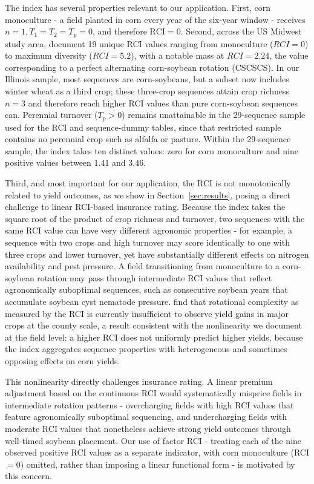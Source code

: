 \documentclass[12pt,letterpaper]{article}
\theoremstyle{remark}
\theoremstyle{remark}
\theoremstyle{plain}
\theoremstyle{definition}
\begin{document}
The index has several properties relevant to our application. First, corn monoculture - a field planted in corn every year of the six-year window - receives $n=1, T_{1}=T_{2}=T_{p}=0$, and therefore $\text{RCI} = 0$. Second, across the US Midwest study area, \citet{socolar2021} document 19 unique RCI values ranging from monoculture ($RCI = 0$) to maximum diversity ($RCI = 5.2$), with a notable mass at $RCI = 2.24$, the value corresponding to a perfect alternating corn-soybean rotation (CSCSCS). In our Illinois sample, most sequences are corn-soybeans, but a subset now includes winter wheat as a third crop; these three-crop sequences attain crop richness $n = 3$ and therefore reach higher RCI values than pure corn-soybean sequences can. Perennial turnover ($T_{p} > 0$) remains unattainable in the 29-sequence sample used for the RCI and sequence-dummy tables, since that restricted sample contains no perennial crop such as alfalfa or pasture. Within the 29-sequence sample, the index takes ten distinct values: zero for corn monoculture and nine positive values between 1.41 and 3.46.

Third, and most important for our application, the RCI is not monotonically related to yield outcomes, as we show in Section~\ref{sec:results}, posing a direct challenge to linear RCI-based insurance rating. Because the index takes the square root of the product of crop richness and turnover, two sequences with the same RCI value can have very different agronomic properties - for example, a sequence with two crops and high turnover may score identically to one with three crops and lower turnover, yet have substantially different effects on nitrogen availability and pest pressure. A field transitioning from monoculture to a corn-soybean rotation may pass through intermediate RCI values that reflect agronomically suboptimal sequences, such as consecutive soybean years that accumulate soybean cyst nematode pressure. \citet{burchfield2024} find that rotational complexity as measured by the RCI is currently insufficient to observe yield gains in major crops at the county scale, a result consistent with the nonlinearity we document at the field level: a higher RCI does not uniformly predict higher yields, because the index aggregates sequence properties with heterogeneous and sometimes opposing effects on corn yields.

This nonlinearity directly challenges insurance rating. A linear premium adjustment based on the continuous RCI would systematically misprice fields in intermediate rotation patterns - overcharging fields with high RCI values that feature agronomically suboptimal sequencing, and undercharging fields with moderate RCI values that nonetheless achieve strong yield outcomes through well-timed soybean placement. Our use of factor RCI - treating each of the nine observed positive RCI values as a separate indicator, with corn monoculture (RCI $= 0$) omitted, rather than imposing a linear functional form - is motivated by this concern.
\end{document}
